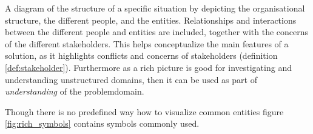 \begin{method} \label{meth:rich_picture} 
  A diagram of the structure of a specific situation by depicting the organisational structure, the different people, and the entities. Relationships and interactions between the different people and entities are included, together with the concerns of the different stakeholders. This helps conceptualize the main features of a solution, as it highlights conflicts and concerns of stakeholders (definition \ref{def:stakeholder}). Furthermore as a rich picture is good for investigating and understanding unstructured domains, then it can be used as part of \emph{understanding} of the problemdomain. \cite[p. 51]{benyon14}

  Though there is no predefined way how to visualize common entities figure \ref{fig:rich_symbols} contains symbols commonly used.
  
\end{method}
